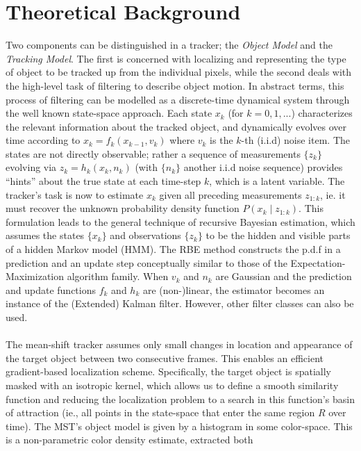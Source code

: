 \documentclass[a4paper,11pt]{article}
\begin{document}
	\section{Theoretical Background}
		Two components can be distinguished in a tracker; the \textit{Object Model}
		and the \textit{Tracking Model}. The first is concerned with localizing and
		representing the type of object to be tracked up from the individual pixels,
		while the second deals with the high-level task of filtering to describe object
		motion.
		In abstract terms, this process of filtering can be modelled as a discrete-time
		dynamical system through the well known state-space approach. Each state $x_k$
		(for $k=0, 1, ...$) characterizes the relevant information about the tracked
		object, and dynamically evolves over time according to $x_k = f_k(x_{k - 1}, v_k)$
		where $v_k$ is the $k$-th (i.i.d) noise item. The states are not directly observable;
		rather a sequence of measurements $\{z_k\}$ evolving via $z_k = h_k(x_k, n_k)$
		(with $\{n_k\}$ another i.i.d noise sequence) provides ``hints'' about the true
		state at each time-step $k$, which is a latent variable. The tracker's task
		is now to estimate $x_k$ given all preceding measurements $z_{1:k}$, ie. it
		must recover the unknown probability density function $P(x_k \mid z_{1:k})$.
		This formulation leads to the general technique of recursive Bayesian estimation,
		which assumes the states $\{x_k\}$ and observations $\{z_k\}$ to be the hidden
		and visible parts of a hidden Markov model (HMM). The RBE method constructs the
		p.d.f in a prediction and an update step conceptually similar to those of the
		Expectation-Maximization algorithm family. When $v_k$ and $n_k$ are Gaussian
		and the prediction and update functions $f_k$ and $h_k$ are (non-)linear, the
		estimator becomes an instance of the (Extended) Kalman filter. However, other
		filter classes can also be used.
		\\ \\
		The mean-shift tracker assumes only small changes in location and appearance
		of the target object between two consecutive frames. This enables an efficient
		gradient-based localization scheme. Specifically, the target object is spatially
		masked with an isotropic kernel, which allows us to define a smooth similarity
		function and reducing the localization problem to a search in this function's
		basin of attraction (ie., all points in the state-space that enter the same
		region $R$ over time). The MST's object model is given by a histogram in some
		color-space. This is a non-parametric color density estimate, extracted both
\end{document}
